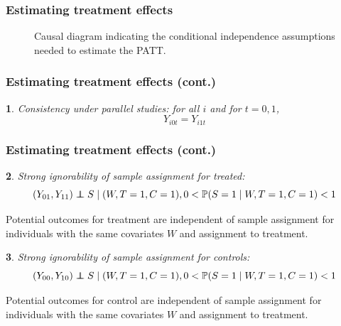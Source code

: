 \documentclass{beamer}
\makeatletter
\newtheorem*{assumption*}{\assumptionnumber}
\providecommand{\assumptionnumber}{}
\newenvironment{assumption}[2]
 {%
  \renewcommand{\assumptionnumber}{Assumption #1}%
  \begin{assumption*}%
  \protected@edef\@currentlabel{#1}%
 }
 {%
  \end{assumption*}
 }
\newcommand{\pr}{\mathbb{P}} %
\newcommand\independent{\protect\mathpalette{\protect\independenT}{\perp}}
\def\independenT#1#2{\mathrel{\rlap{$#1#2$}\mkern2mu{#1#2}}}
\makeatother
\begin{document}
\begin{frame}
\frametitle{Estimating treatment effects}
\begin{figure}[h]
\caption{Causal diagram indicating the conditional independence assumptions needed to estimate the PATT.}\label{fig:DAG}
\end{figure}

\end{frame}

\begin{frame}
\frametitle{Estimating treatment effects (cont.)}
\begin{assumption}{1}{}\label{consistency}
Consistency under parallel studies: for all $i$ and for $t=0, 1$,
$$Y_{i0t} = Y_{i1t}$$
\end{assumption}
\end{frame}

\begin{frame}
\frametitle{Estimating treatment effects (cont.)}
\begin{assumption}{2}{}\label{si_treat}
Strong ignorability of sample assignment for treated:
\begin{equation*}
(Y_{01}, Y_{11}) \independent S \mid (W, T=1,C = 1), 0 < \pr(S=1 \mid W, T=1,C = 1) <1 
\end{equation*}
\end{assumption}
\noindent Potential outcomes for treatment are independent of sample assignment for individuals with the same covariates $W$ and assignment to treatment.

\begin{assumption}{3}{}\label{si_ctrl}
Strong ignorability of sample assignment for controls:
\begin{equation*}
(Y_{00}, Y_{10}) \independent S \mid (W, T=1,C = 1), 0 < \pr(S=1 \mid W, T=1,C = 1) <1 
\end{equation*}\end{assumption}

\noindent Potential outcomes for control are independent of sample assignment for individuals with the same covariates $W$ and assignment to treatment.
\end{frame}
\end{document}
